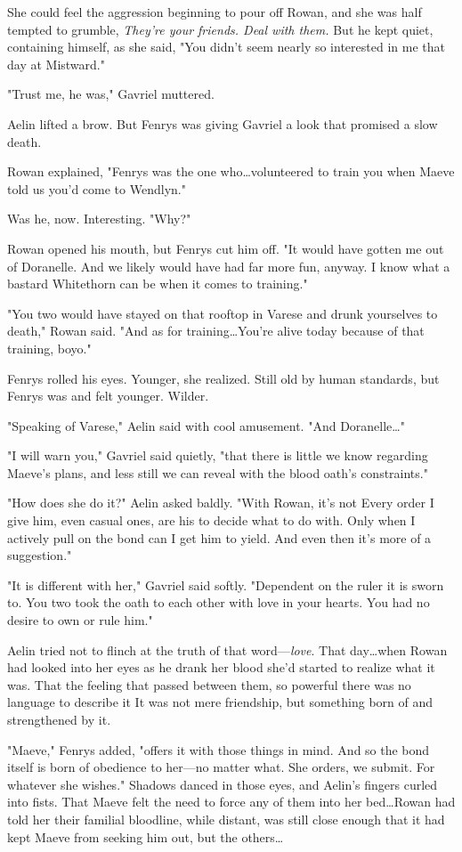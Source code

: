 She could feel the aggression beginning to pour off Rowan, and she was half tempted to grumble, \emph{They're your friends.
Deal with them.}
But he kept quiet, containing himself, as she said, "You didn't seem nearly so interested in me that day at Mistward."

"Trust me, he was," Gavriel muttered.

Aelin lifted a brow.
But Fenrys was giving Gavriel a look that promised a slow death.

Rowan explained, "Fenrys was the one who\ldots volunteered to train you when Maeve told us you'd come to Wendlyn."

Was he, now.
Interesting.
"Why?"

Rowan opened his mouth, but Fenrys cut him off.
"It would have gotten me out of Doranelle.
And we likely would have had far more fun, anyway.
I know what a bastard Whitethorn can be when it comes to training."

"You two would have stayed on that rooftop in Varese and drunk yourselves to death," Rowan said.
"And as for training\ldots You're alive today because of that training, boyo."

Fenrys rolled his eyes.
Younger, she realized.
Still old by human standards, but Fenrys was and felt younger.
Wilder.

"Speaking of Varese," Aelin said with cool amusement.
"And Doranelle\ldots"

"I will warn you," Gavriel said quietly, "that there is little we know regarding Maeve's plans, and less still we can reveal with the blood oath's constraints."

"How does she do it?"
Aelin asked baldly.
"With Rowan, it's not  Every order I give him, even casual ones, are his to decide what to do with.
Only when I actively pull on the bond can I get him to  yield.
And even then it's more of a suggestion."

"It is different with her," Gavriel said softly.
"Dependent on the ruler it is sworn to.
You two took the oath to each other with love in your hearts.
You had no desire to own or rule him."

Aelin tried not to flinch at the truth of that word---\emph{love}.
That day\ldots when Rowan had looked into her eyes as he drank her blood  she'd started to realize what it was.
That the feeling that passed between them, so powerful there was no language to describe it  It was not mere friendship, but something born of and strengthened by it.

"Maeve," Fenrys added, "offers it with those things in mind.
And so the bond itself is born of obedience to her---no matter what.
She orders, we submit.
For whatever she wishes."
Shadows danced in those eyes, and Aelin's fingers curled into fists.
That Maeve felt the need to force any of them into her bed\ldots Rowan had told her their familial bloodline, while distant, was still close enough that it had kept Maeve from seeking him out, but the others\ldots{}

